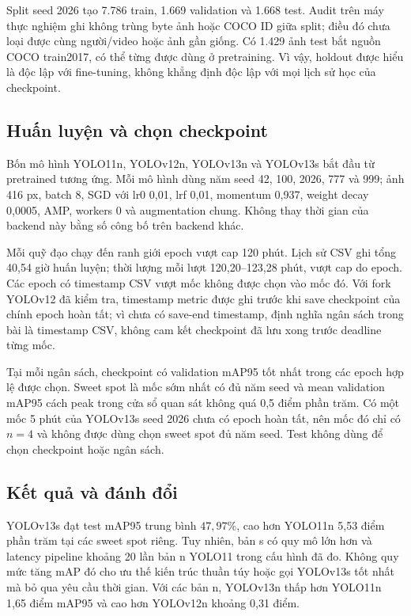 \documentclass[a4paper,fleqn]{cas-dc}
\begin{document}
Split seed 2026 tạo 7.786 train, 1.669 validation và 1.668 test. Audit trên máy thực nghiệm ghi không trùng byte ảnh hoặc COCO ID giữa split; điều đó chưa loại được cùng người/video hoặc ảnh gần giống. Có 1.429 ảnh test bắt nguồn COCO train2017, có thể từng được dùng ở pretraining. Vì vậy, holdout được hiểu là độc lập với fine-tuning, không khẳng định độc lập với mọi lịch sử học của checkpoint.

\subsection{Huấn luyện và chọn checkpoint}

Bốn mô hình YOLO11n, YOLOv12n, YOLOv13n và YOLOv13s bắt đầu từ pretrained tương ứng. Mỗi mô hình dùng năm seed 42, 100, 2026, 777 và 999; ảnh 416 px, batch 8, SGD với lr0 0,01, lrf 0,01, momentum 0,937, weight decay 0,0005, AMP, workers 0 và augmentation chung. Không thay thời gian của backend này bằng số công bố trên backend khác.

Mỗi quỹ đạo chạy đến ranh giới epoch vượt cap 120 phút. Lịch sử CSV ghi tổng 40,54 giờ huấn luyện; thời lượng mỗi lượt 120,20--123,28 phút, vượt cap do epoch. Các epoch có timestamp CSV vượt mốc không được chọn vào mốc đó. Với fork YOLOv12 đã kiểm tra, timestamp metric được ghi trước khi save checkpoint của chính epoch hoàn tất; vì chưa có save-end timestamp, định nghĩa ngân sách trong bài là timestamp CSV, không cam kết checkpoint đã lưu xong trước deadline từng mốc.

Tại mỗi ngân sách, checkpoint có validation mAP95 tốt nhất trong các epoch hợp lệ được chọn. Sweet spot là mốc sớm nhất có đủ năm seed và mean validation mAP95 cách peak trong cửa sổ quan sát không quá 0,5 điểm phần trăm. Có một mốc 5 phút của YOLOv13s seed 2026 chưa có epoch hoàn tất, nên mốc đó chỉ có $n=4$ và không được dùng chọn sweet spot đủ năm seed. Test không dùng để chọn checkpoint hoặc ngân sách.

\subsection{Kết quả và đánh đổi}

YOLOv13s đạt test mAP95 trung bình $47{,}97\%$, cao hơn YOLO11n 5,53 điểm phần trăm tại các sweet spot riêng. Tuy nhiên, bản s có quy mô lớn hơn và latency pipeline khoảng 20 lần bản n YOLO11 trong cấu hình đã đo. Không quy mức tăng mAP đó cho ưu thế kiến trúc thuần túy hoặc gọi YOLOv13s tốt nhất mà bỏ qua yêu cầu thời gian. Với các bản n, YOLOv13n thấp hơn YOLO11n 1,65 điểm mAP95 và cao hơn YOLOv12n khoảng 0,31 điểm.
\end{document}
